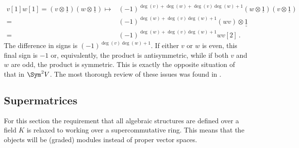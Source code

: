 \begin{remark}
        \begin{align*}
            v[1]w[1]=(v\otimes\underline{1})(w\otimes\underline{1})\mapsto&(-1)^{\deg(v)+\deg(w)+\deg(v)\deg(w)+1}(w\otimes\underline{1})(v\otimes\underline{1})\\
            =&(-1)^{\deg(w)+\deg(v)\deg(w)+1}(wv)\otimes\underline{\underline{1}}\\
            =&(-1)^{\deg(w)+\deg(v)\deg(w)+1}wv[2]\,.
        \end{align*}
        The difference in signs is $(-1)^{\deg(v)\deg(w)+1}$. If either $v$ or $w$ is even, this final sign is $-1$ or, equivalently, the product is antisymmetric, while if both $v$ and $w$ are odd, the product is symmetric. This is exactly the opposite situation of that in $\Sym^2V$. The most thorough review of these issues was found in \cite{MitiAntonioMichele2021Hcmi}.
    \end{remark}

\subsection{Supermatrices}

    For this section the requirement that all algebraic structures are defined over a field $K$ is relaxed to working over a supercommutative ring. This means that the objects will be (graded) modules instead of proper vector spaces.

